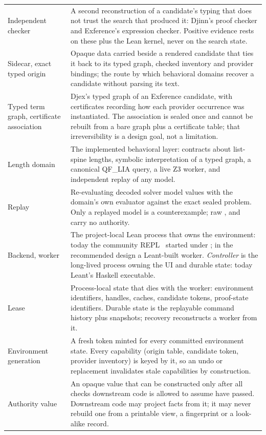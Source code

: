 \documentclass[10pt,letterpaper,oneside]{report}
\newcommand{\code}[1]{\texttt{\detokenize{#1}}}
\begin{document}
\begin{longtable}{@{}L{0.21\textwidth}L{0.71\textwidth}@{}}
Independent checker & A second reconstruction of a candidate's typing that does not trust the search that produced it: Djinn's proof checker and Exference's expression checker. Positive evidence rests on these plus the Lean kernel, never on the search state. \\
Sidecar, exact typed origin & Opaque data carried beside a rendered candidate that ties it back to its typed graph, checked inventory and provider bindings; the route by which behavioral domains recover a candidate without parsing its text. \\
Typed term graph, certificate association & Djex's typed graph of an Exference candidate, with certificates recording how each provider occurrence was instantiated. The association is sealed once and cannot be rebuilt from a bare graph plus a certificate table; that irreversibility is a design goal, not a limitation. \\
Length domain & The implemented behavioral layer: contracts about list-spine lengths, symbolic interpretation of a typed graph, a canonical QF\_LIA query, a live Z3 worker, and independent replay of any model. \\
Replay & Re-evaluating decoded solver model values with the domain's own evaluator against the exact sealed problem. Only a replayed model is a counterexample; raw \code{sat}, \code{unsat} and \code{unknown} carry no authority. \\
Backend, worker & The project-local Lean process that owns the environment: today the community REPL~\cite{lean-repl} started under \code{lake env}; in the recommended design a Leant-built worker. \emph{Controller} is the long-lived process owning the UI and durable state: today Leant's Haskell executable. \\
Lease & Process-local state that dies with the worker: environment identifiers, handles, caches, candidate tokens, proof-state identifiers. Durable state is the replayable command history plus snapshots; recovery reconstructs a worker from it. \\
Environment generation & A fresh token minted for every committed environment state. Every capability (origin table, candidate token, provider inventory) is keyed by it, so an undo or replacement invalidates stale capabilities by construction. \\
Authority value & An opaque value that can be constructed only after all checks downstream code is allowed to assume have passed. Downstream code may project facts from it; it may never rebuild one from a printable view, a fingerprint or a look-alike record. \\

\end{longtable}
\end{document}
